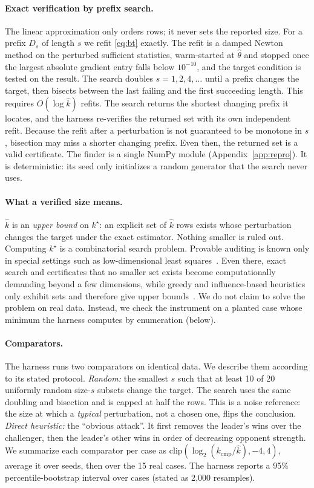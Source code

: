 \documentclass{article}
\newcommand{\kver}{\hat{k}}
\begin{document}
\paragraph{Exact verification by prefix search.}
The linear approximation only orders rows; it never sets the reported size. For a prefix $D_s$ of length $s$ we refit \eqref{eq:bt} exactly. The refit is a damped Newton method on the perturbed sufficient statistics, warm-started at $\hat\theta$ and stopped once the largest absolute gradient entry falls below $10^{-10}$, and the target condition is tested on the result. The search doubles $s=1,2,4,\dots$ until a prefix changes the target, then bisects between the last failing and the first succeeding length. This requires $O(\log \kver)$ refits. The search returns the shortest changing prefix it locates, and the harness re-verifies the returned set with its own independent refit. Because the refit after a perturbation is not guaranteed to be monotone in $s$, bisection may miss a shorter changing prefix. Even then, the returned set is a valid certificate. The finder is a single NumPy module (Appendix~\ref{app:repro}). It is deterministic: its seed only initializes a random generator that the search never uses.

\paragraph{What a verified size means.}
$\kver$ is an \emph{upper bound} on $k^\star$: an explicit set of $\kver$ rows exists whose perturbation changes the target under the exact estimator. Nothing smaller is ruled out. Computing $k^\star$ is a combinatorial search problem. Provable auditing is known only in special settings such as low-dimensional least squares~\citep{Moitra2022ProvablyAO}. Even there, exact search and certificates that no smaller set exists become computationally demanding beyond a few dimensions, while greedy and influence-based heuristics only exhibit sets and therefore give upper bounds~\citep{Freund2023TowardsPR}. We do not claim to solve the problem on real data. Instead, we check the instrument on a planted case whose minimum the harness computes by enumeration (below).

\paragraph{Comparators.}
The harness runs two comparators on identical data. We describe them according to its stated protocol. \emph{Random:} the smallest $s$ such that at least 10 of 20 uniformly random size-$s$ subsets change the target. The search uses the same doubling and bisection and is capped at half the rows. This is a noise reference: the size at which a \emph{typical} perturbation, not a chosen one, flips the conclusion. \emph{Direct heuristic:} the ``obvious attack''. It first removes the leader's wins over the challenger, then the leader's other wins in order of decreasing opponent strength. We summarize each comparator per case as $\mathrm{clip}(\log_2(k_{\text{cmp}}/\kver),-4,4)$, average it over seeds, then over the 15 real cases. The harness reports a 95\% percentile-bootstrap interval over cases (stated as 2{,}000 resamples).
\end{document}
